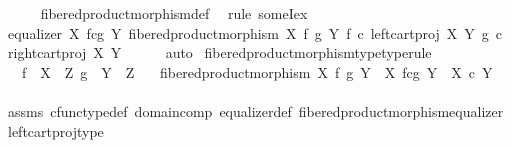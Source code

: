 \begin{isabellebody}
\ \ \ \ \isamarkupfalse%
\ fibered{\isacharunderscore}{\kern0pt}product{\isacharunderscore}{\kern0pt}morphism{\isacharunderscore}{\kern0pt}def\ \isamarkupfalse%
\ {\isacharparenleft}{\kern0pt}rule\ someI{\isacharunderscore}{\kern0pt}ex{\isacharparenright}{\kern0pt}\isanewline
\ \ \isamarkupfalse%
\ \isamarkupfalse%
\ {\isachardoublequoteopen}equalizer\ {\isacharparenleft}{\kern0pt}X\ \isactrlbsub f\isactrlesub {\isasymtimes}\isactrlsub c\isactrlbsub g\isactrlesub \ Y{\isacharparenright}{\kern0pt}\ {\isacharparenleft}{\kern0pt}fibered{\isacharunderscore}{\kern0pt}product{\isacharunderscore}{\kern0pt}morphism\ X\ f\ g\ Y{\isacharparenright}{\kern0pt}\ {\isacharparenleft}{\kern0pt}f\ {\isasymcirc}\isactrlsub c\ left{\isacharunderscore}{\kern0pt}cart{\isacharunderscore}{\kern0pt}proj\ X\ Y{\isacharparenright}{\kern0pt}\ {\isacharparenleft}{\kern0pt}g\ {\isasymcirc}\isactrlsub c\ right{\isacharunderscore}{\kern0pt}cart{\isacharunderscore}{\kern0pt}proj\ X\ Y{\isacharparenright}{\kern0pt}{\isachardoublequoteclose}\isanewline
\ \ \ \ \isamarkupfalse%
\ auto\isanewline
{}\isamarkupfalse%
%
\endisatagproof
{\isafoldproof}%
%
\isadelimproof
\isanewline
%
\endisadelimproof
\isanewline
{}\isamarkupfalse%
\ fibered{\isacharunderscore}{\kern0pt}product{\isacharunderscore}{\kern0pt}morphism{\isacharunderscore}{\kern0pt}type{\isacharbrackleft}{\kern0pt}type{\isacharunderscore}{\kern0pt}rule{\isacharbrackright}{\kern0pt}{\isacharcolon}{\kern0pt}\isanewline
\ \ \ {\isachardoublequoteopen}f\ {\isacharcolon}{\kern0pt}\ X\ {\isasymrightarrow}\ Z{\isachardoublequoteclose}\ {\isachardoublequoteopen}g\ {\isacharcolon}{\kern0pt}\ Y\ {\isasymrightarrow}\ Z{\isachardoublequoteclose}\isanewline
\ \ \ {\isachardoublequoteopen}fibered{\isacharunderscore}{\kern0pt}product{\isacharunderscore}{\kern0pt}morphism\ X\ f\ g\ Y\ {\isacharcolon}{\kern0pt}\ X\ \isactrlbsub f\isactrlesub {\isasymtimes}\isactrlsub c\isactrlbsub g\isactrlesub \ Y\ {\isasymrightarrow}\ X\ {\isasymtimes}\isactrlsub c\ Y{\isachardoublequoteclose}\isanewline
%
\isadelimproof
\ \ %
\endisadelimproof
%
\isatagproof
{}\isamarkupfalse%
\ assms\ cfunc{\isacharunderscore}{\kern0pt}type{\isacharunderscore}{\kern0pt}def\ domain{\isacharunderscore}{\kern0pt}comp\ equalizer{\isacharunderscore}{\kern0pt}def\ fibered{\isacharunderscore}{\kern0pt}product{\isacharunderscore}{\kern0pt}morphism{\isacharunderscore}{\kern0pt}equalizer\ left{\isacharunderscore}{\kern0pt}cart{\isacharunderscore}{\kern0pt}proj{\isacharunderscore}{\kern0pt}type\ \isamarkupfalse%

\end{isabellebody}
